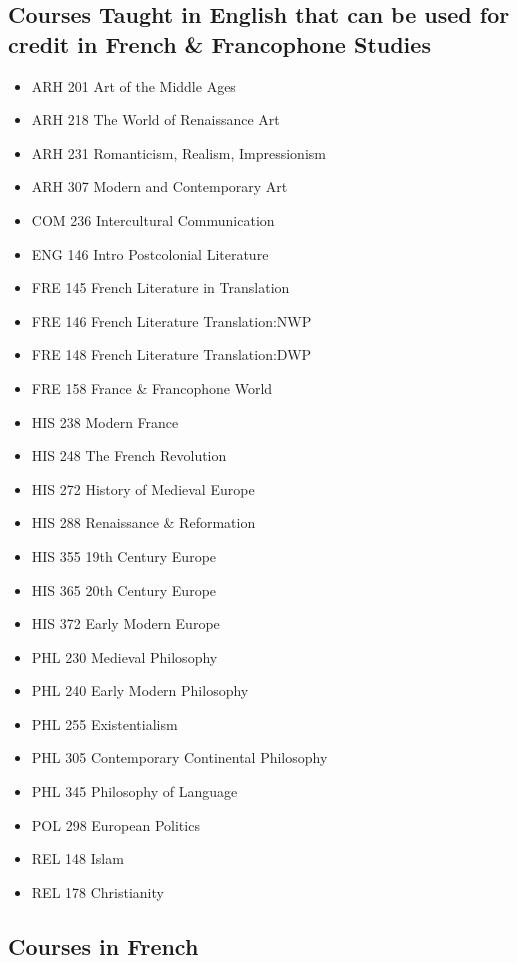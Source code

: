 \documentclass[
  letterpaper,
]{scrbook}
\providecommand{\tightlist}{%
  \setlength{\itemsep}{0pt}\setlength{\parskip}{0pt}}
\begin{document}
\subsection{Courses Taught in English that can be used for credit in
French \& Francophone
Studies}\label{courses-taught-in-english-that-can-be-used-for-credit-in-french-francophone-studies}

\begin{itemize}
\tightlist
\item
  ARH 201 Art of the Middle Ages
\item
  ARH 218 The World of Renaissance Art
\item
  ARH 231 Romanticism, Realism, Impressionism
\item
  ARH 307 Modern and Contemporary Art
\item
  COM 236 Intercultural Communication
\item
  ENG 146 Intro Postcolonial Literature
\item
  FRE 145 French Literature in Translation
\item
  FRE 146 French Literature Translation:NWP
\item
  FRE 148 French Literature Translation:DWP
\item
  FRE 158 France \& Francophone World
\item
  HIS 238 Modern France
\item
  HIS 248 The French Revolution
\item
  HIS 272 History of Medieval Europe
\item
  HIS 288 Renaissance \& Reformation
\item
  HIS 355 19th Century Europe
\item
  HIS 365 20th Century Europe
\item
  HIS 372 Early Modern Europe
\item
  PHL 230 Medieval Philosophy
\item
  PHL 240 Early Modern Philosophy
\item
  PHL 255 Existentialism
\item
  PHL 305 Contemporary Continental Philosophy
\item
  PHL 345 Philosophy of Language
\item
  POL 298 European Politics
\item
  REL 148 Islam
\item
  REL 178 Christianity
\end{itemize}

\subsection{Courses in French}\label{courses-in-french}
\end{document}
